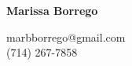 \documentclass[letterpaper,11pt,oneside]{article}
\begin{document}

\noindent  \LARGE{\textbf{Marissa Borrego}}  \\
\vspace{-3 ex}
\normalsize
\vspace{1em}
\hline


\begin{center}
marbborrego@gmail.com \\
(714) 267-7858 \\
\end{center}

\vspace{1em}

\end{document}
